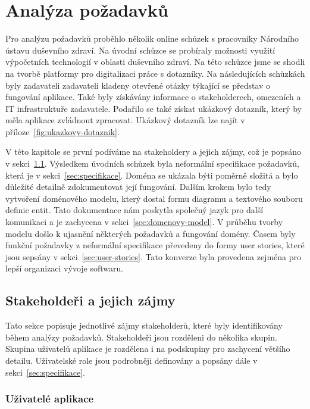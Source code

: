 \chapter{Analýza požadavků}\label{ch:analyza-pozadavku}

Pro analýzu požadavků proběhlo několik online schůzek s pracovníky Národního ústavu duševního zdraví.
Na úvodní schůzce se probíraly možnosti využití výpočetních technologií v oblasti duševního zdraví.
Na této schůzce jsme se shodli na tvorbě platformy pro digitalizaci práce s dotazníky.
Na následujících schůzkách byly zadavateli zadavateli kladeny otevřené otázky týkající se představ o fungování aplikace.
Také byly získávány informace o stakeholderech, omezeních a IT infrastruktuře zadavatele.
Podařilo se také získat ukázkový dotazník, který by měla aplikace zvládnout zpracovat.
Ukázkový dotazník lze najít v příloze~\ref{fig:ukazkovy-dotaznik}.

V této kapitole se první podíváme na stakeholdery a jejich zájmy, což je popsáno v sekci~\ref{sec:stakeholderi}.
Výsledkem úvodních schůzek byla neformální specifikace požadavků, která je v sekci~\ref{sec:specifikace}.
Doména se ukázala býti poměrně složitá a bylo důležité detailně zdokumentovat její fungování.
Dalším krokem bylo tedy vytvoření doménového modelu, který dostal formu diagramu a textového souboru definic entit.
Tato dokumentace nám poskytla společný jazyk pro další komunikaci a je zachycena v sekci~\ref{sec:domenovy-model}.
V průběhu tvorby modelu došlo k ujasnění některých požadavků a fungování domény.
Časem byly funkční požadavky z neformální specifikace převedeny do formy user stories, které jsou sepsány v sekci~\ref{sec:user-stories}.
Tato konverze byla provedena zejména pro lepší organizaci vývoje softwaru.


\section{Stakeholdeři a jejich zájmy}\label{sec:stakeholderi}

Tato sekce popisuje jednotlivé zájmy stakeholderů, které byly identifikovány během analýzy požadavků.
Stakeholdeři jsou rozděleni do několika skupin.
Skupina uživatelů aplikace je rozdělena i na podskupiny pro zachycení většího detailu.
Uživatelské role jsou podrobněji definovány a popsány dále v sekci~\ref{sec:specifikace}.

\subsection*{Uživatelé aplikace}\label{subsec:uzivatele-aplikace}

